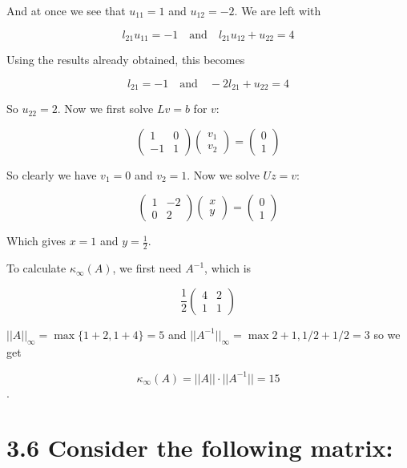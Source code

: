 \documentclass{article}
\begin{document}
And at once we see that $u_{11} = 1$ and $u_{12} = -2$. We are left with

$$l_{21}u_{11} = -1 \quad \text{and} \quad l_{21}u_{12} + u_{22} = 4$$

Using the results already obtained, this becomes

$$l_{21} = -1 \quad \text{and} \quad -2l_{21} + u_{22} = 4$$

So $u_{22} = 2$. Now we first solve $Lv = b$ for $v$:

$$
\begin{pmatrix} 1 & 0 \\ -1 & 1 \end{pmatrix}
\begin{pmatrix} v_1 \\ v_2 \end{pmatrix}
=
\begin{pmatrix} 0 \\ 1 \end{pmatrix}
$$

So clearly we have $v_1 = 0$ and $v_2 = 1$. Now we solve $Uz = v$:

$$
\begin{pmatrix} 1 & -2 \\ 0 & 2 \end{pmatrix}
\begin{pmatrix} x \\ y \end{pmatrix}
=
\begin{pmatrix} 0 \\ 1 \end{pmatrix}
$$

Which gives $x = 1$ and $y = \frac{1}{2}$.

\smallskip

\noindent To calculate $\kappa_{\infty}(A)$, we first need $A^{-1}$, which is 

$$\frac{1}{2}\begin{pmatrix}
  4 & 2 \\ 1 & 1
\end{pmatrix}$$
  
$||A||_{\infty} = \max\{1 + 2, 1 + 4\} = 5$ and $||A^{-1}||_{\infty} = \max{2 + 1, 1/2 + 1/2} = 3$ so we get

$$\kappa_{\infty}(A) = ||A||\cdot||A^{-1}|| = 15$$.

\section*{3.6 \normalsize Consider the following matrix:}
\end{document}
